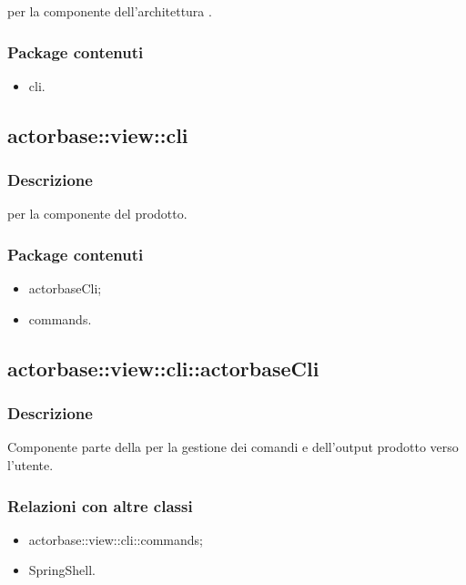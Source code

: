 \documentclass{scalatekids-article}
\begin{document}
 per la componente  dell'architettura .

\subsubsection{Package contenuti}

\begin{itemize}
\item cli.
\end{itemize}

\subsection{actorbase::view::cli}

\subsubsection{Descrizione}

 per la componente  del prodotto.

\subsubsection{Package contenuti}

\begin{itemize}
\item actorbaseCli;
\item commands.
\end{itemize}

\subsection{actorbase::view::cli::actorbaseCli}

\subsubsection{Descrizione}

Componente parte della  per la gestione dei comandi e dell'output prodotto verso l'utente.

\subsubsection{Relazioni con altre classi}

\begin{itemize}
\item actorbase::view::cli::commands;
\item SpringShell.
\end{itemize}
\end{document}
